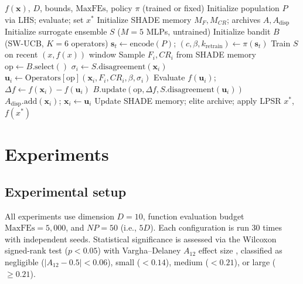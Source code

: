 \documentclass[preprint,12pt,authoryear]{elsarticle}
\newcommand{\sdg}{\textsc{SDG-MetaBBO}}
\newcommand{\xbest}{x^*}
\begin{document}
\begin{algorithm}[t]
\caption{\sdg{}: Surrogate-Disagreement-Guided MetaBBO}
\label{alg:sdg}
\begin{algorithmic}[1]
\REQUIRE $f(\mathbf{x})$, $D$, bounds, $\text{MaxFEs}$, policy $\pi$ (trained or fixed)
\STATE Initialize population $P$ via LHS; evaluate; set $\xbest$
\STATE Initialize SHADE memory $M_F, M_{CR}$; archives $A, A_{\text{disp}}$
\STATE Initialize surrogate ensemble $S$ ($M{=}5$ MLPs, untrained)
\STATE Initialize bandit $B$ (SW-UCB, $K{=}6$ operators)
    \STATE $\mathbf{s}_t \gets \text{encode}(P)$; $(c, \beta, k_{\text{retrain}}) \gets \pi(\mathbf{s}_t)$
  \ENDIF
    \STATE Train $S$ on recent $(x, f(x))$ window
  \ENDIF
    \STATE Sample $F_i, CR_i$ from SHADE memory
    \STATE $\text{op} \gets B.\text{select}()$ \hfill {}
    \STATE $\sigma_i \gets S.\text{disagreement}(\mathbf{x}_i)$
    \STATE $\mathbf{u}_i \gets \text{Operators}[\text{op}](\mathbf{x}_i, F_i, CR_i, \beta, \sigma_i)$
    \STATE Evaluate $f(\mathbf{u}_i)$; $\Delta f \gets f(\mathbf{x}_i) - f(\mathbf{u}_i)$
    \STATE $B.\text{update}(\text{op}, \Delta f, S.\text{disagreement}(\mathbf{u}_i))$
      \STATE $A_{\text{disp}}.\text{add}(\mathbf{x}_i)$; $\mathbf{x}_i \gets \mathbf{u}_i$
    \ENDIF
  \ENDFOR
  \STATE Update SHADE memory; elite archive; apply LPSR
\ENDWHILE
\RETURN $\xbest$, $f(\xbest)$
\end{algorithmic}
\end{algorithm}

\section{Experiments}
\label{sec:experiments}

\subsection{Experimental setup}

All experiments use dimension $D = 10$, function evaluation budget $\text{MaxFEs} = 5{,}000$, and $NP = 50$ (i.e., $5D$). Each configuration is run 30 times with independent seeds. Statistical significance is assessed via the Wilcoxon signed-rank test ($p < 0.05$) with Vargha--Delaney $A_{12}$ effect size \citep{Vargha2000}, classified as negligible ($|A_{12} - 0.5| < 0.06$), small ($< 0.14$), medium ($< 0.21$), or large ($\geq 0.21$).
\end{document}
